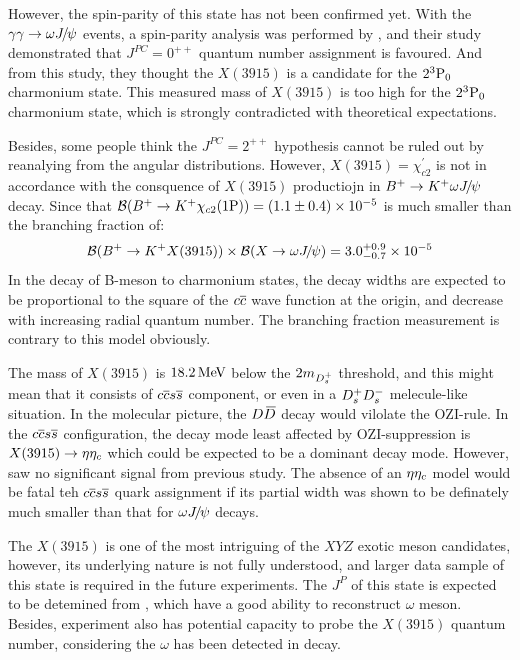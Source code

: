 However,
the spin-parity of this state has not been confirmed yet.
With the ${\gamma}{\gamma}\rightarrow\omega{\ensuremath{{J\mskip -3mu/\mskip -2mu\psi}}}$ events,
a spin-parity analysis was performed by \babar,
and their study demonstrated that $J^{PC}=0^{++}$ quantum number assignment is favoured.
And from this study,
they thought the $X(3915)$ is a candidate for the $2^{3}\rm{P}_{0}$ charmonium state\supercite{PhysRevLett.104.092001}.
This measured mass of $X(3915)$ is too high for the $2^{3}\rm{P}_{0}$ charmonium state,
which is strongly contradicted with theoretical expectations\supercite{PhysRevD.69.094019,PhysRevD.79.094004}.

Besides,
some people think the $J^{PC}=2^{++}$ hypothesis cannot be ruled out by reanalying from the \babar angular distributions\supercite{PhysRevLett.115.022001}.
However,
$X(3915)=\chi_{c2}^{'}$ is not in accordance with the consquence of $X(3915)$ productiojn in ${{{B}^+}}\rightarrow{\ensuremath{{K}^+}}\omega{\ensuremath{{J\mskip -3mu/\mskip -2mu\psi}}}$ decay.
Since that ${\mathcal{B}}({{{B}^+}}\rightarrow{\ensuremath{{K}^+}}{\ensuremath{\chi_{{c} 2}}}(1\rm{P})) = (1.1\pm0.4)\times10^{-5}$ is much smaller than the branching fraction of:
\begin{equation}
{\ensuremath{\mathcal{B}}}({{{B}^+}}\rightarrow{\ensuremath{{K}^+}} X(3915))\times{\ensuremath{\mathcal{B}}}(X\rightarrow\omega{\ensuremath{{J\mskip -3mu/\mskip -2mu\psi}}})=3.0^{+0.9}_{-0.7}\times10^{-5}
\label{eq:X_3915_BF}
\end{equation}
In the decay of B-meson to charmonium states, 
the decay widths are expected to be proportional to the square of the ${c}{\overline {{c}}}$ wave function at the origin,
and decrease with increasing radial quantum number\supercite{PhysRevD.46.R3703}.
The branching fraction measurement is contrary to this model obviously.

The mass of $X(3915)$ is $18.2 \text{\,Me\kern -0.1em V}$ below the $2m_{{{D}^+_{s}}}$ threshold,
and this might mean that it consists of ${c}{\overline {{c}}}{s}{\overline {{s}}}$ component,
or even in a ${{D}^+_{s}}{{D}^-_{s}}$ melecule-like situation.
In the molecular picture,
the ${D}{\kern 0.18em\overline{\kern -0.18em D}}$ decay would vilolate the OZI-rule\supercite{PhysRevD.59.114027}.
In the ${c}{\overline {{c}}}{s}{\overline {{s}}}$ configuration,
the decay mode least affected by OZI-suppression is $X(3915)\rightarrow\eta{\ensuremath{\eta_{c}}}$ which could be expected to be a dominant decay mode.
However,
\belle saw no significant signal from previous study\supercite{Vinokurova:2015txd}.
The absence of an $\eta{\ensuremath{\eta_{c}}}$ model would be fatal teh ${c}{\overline {{c}}}{s}{\overline {{s}}}$ quark assignment 
if its partial width was shown to be definately much smaller than that for $\omega{\ensuremath{{J\mskip -3mu/\mskip -2mu\psi}}}$ decays.


The $X(3915)$ is one of the most intriguing of the $XYZ$ exotic meson candidates,
however, 
its underlying nature is not fully understood,
and larger data sample of this state is required in the future experiments.
The $J^{P}$ of this state is expected to be detemined from \belletwo,
which have a good ability to reconstruct $\omega$ meson.
Besides,
\lhcb experiment also has potential capacity to probe the $X(3915)$ quantum number,
considering the $\omega$ has been detected in \Bp decay\supercite{LHCb-PAPER-2012-022}.


